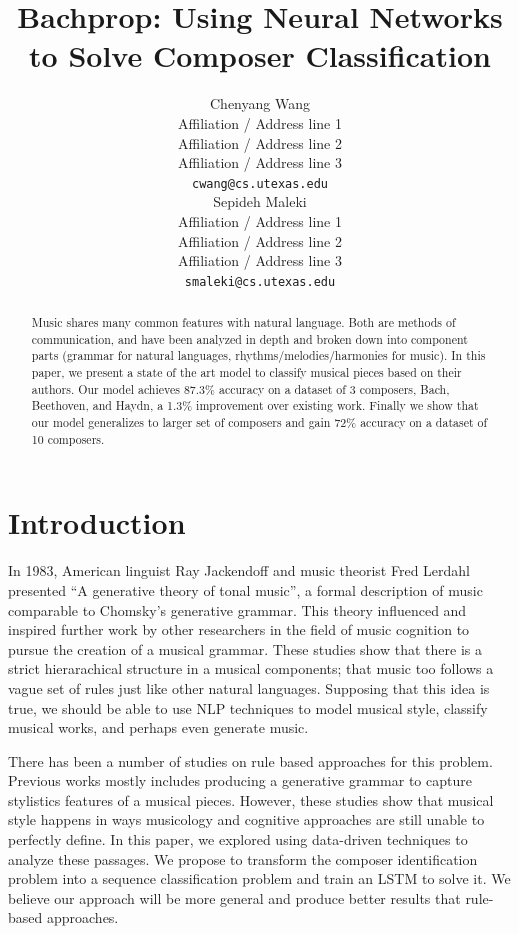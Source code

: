 \documentclass[11pt,a4paper]{article}
\title{Bachprop: Using Neural Networks to Solve Composer Classification}
\author{Chenyang Wang \\
  Affiliation / Address line 1 \\
  Affiliation / Address line 2 \\
  Affiliation / Address line 3 \\
  {\tt cwang@cs.utexas.edu} \\\And
  Sepideh Maleki \\
  Affiliation / Address line 1 \\
  Affiliation / Address line 2 \\
  Affiliation / Address line 3 \\
  {\tt smaleki@cs.utexas.edu} \\}
\date{}
\begin{document}
\maketitle
\begin{abstract}
Music shares many common features with natural language. Both are methods of communication, and have been analyzed in depth and broken down into component parts (grammar for natural languages, rhythms/melodies/harmonies for music). In this paper, we present a state of the art model to classify musical pieces based on their authors. Our model achieves 87.3\% accuracy on a dataset of 3 composers, Bach, Beethoven, and Haydn, a 1.3\% improvement over existing work. Finally we show that our model generalizes to larger set of composers and gain 72\% accuracy on a dataset of 10 composers.
\end{abstract}

\section{Introduction}


In 1983, American linguist Ray Jackendoff and music theorist Fred Lerdahl presented ``A generative theory of tonal music'', a formal description of music comparable to Chomsky's generative grammar. This theory influenced and inspired further work by other researchers in the field of music cognition to pursue the creation of a musical grammar. These studies show that there is a strict hierarachical structure in a musical components; that music too follows a vague set of rules just like other natural languages. Supposing that this idea is true, we should be able to use NLP techniques to model musical style, classify musical works, and perhaps even generate music.

There has been a number of studies on rule based approaches for this problem. Previous works mostly includes producing a generative grammar to capture stylistics features of a musical pieces. However, these studies show that musical style happens in ways musicology and cognitive approaches are still unable to perfectly define. In this paper, we explored using  data-driven techniques to analyze these passages. We propose to transform the composer identification problem into a sequence classification problem and train an LSTM to solve it.  We believe our approach will be more general and produce better results that rule-based approaches.
\end{document}
